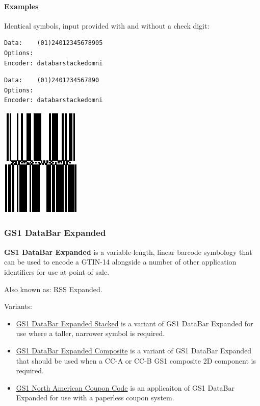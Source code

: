 \hypertarget{examples-25}{%
\paragraph{Examples}\label{examples-25}}

Identical symbols, input provided with and without a check digit:

\begin{verbatim}
Data:    (01)24012345678905
Options: 
Encoder: databarstackedomni
\end{verbatim}

\begin{verbatim}
Data:    (01)2401234567890
Options: 
Encoder: databarstackedomni
\end{verbatim}

\includegraphics{images/databarstackedomni-1.eps}

\hypertarget{gs1-databar-expanded}{%
\subsubsection{GS1 DataBar Expanded}\label{gs1-databar-expanded}}

\textbf{GS1 DataBar Expanded} is a variable-length, linear barcode
symbology that can be used to encode a GTIN-14 alongside a number of
other application identifiers for use at point of sale.

Also known as: RSS Expanded.

Variants:

\begin{itemize}
\tightlist
\item
  \protect\hyperlink{gs1-databar-expanded-stacked}{GS1 DataBar Expanded
  Stacked} is a variant of GS1 DataBar Expanded for use where a taller,
  narrower symbol is required.
\item
  \protect\hyperlink{gs1-composite-symbols}{GS1 DataBar Expanded
  Composite} is a variant of GS1 DataBar Expanded that should be used
  when a CC-A or CC-B GS1 composite 2D component is required.
\item
  \protect\hyperlink{gs1-north-american-coupon-code}{GS1 North American
  Coupon Code} is an applicaiton of GS1 DataBar Expanded for use with a
  paperless coupon system.
\end{itemize}


